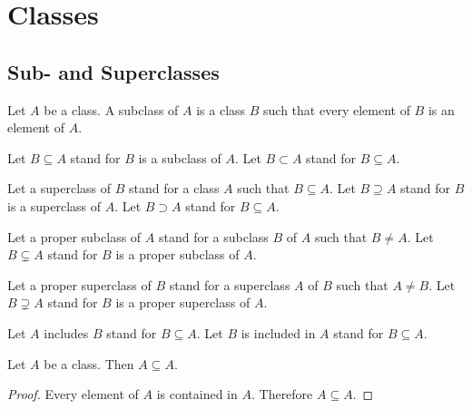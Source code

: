 \documentclass[10pt]{article}
\begin{document}
  \begin{imports}
    \begin{forthel}
    \end{forthel}
  \end{imports}


  \section*{Classes}

  \subsection*{Sub- and Superclasses}

  \begin{forthel}
    \begin{definition}
      Let $A$ be a class.
      A subclass of $A$ is a class $B$ such that every element of $B$ is an
      element of $A$.
    \end{definition}

    Let $B \subseteq A$ stand for $B$ is a subclass of $A$.
    Let $B \subset A$ stand for $B \subseteq A$.

    Let a superclass of $B$ stand for a class $A$ such that $B \subseteq A$.
    Let $B \supseteq A$ stand for $B$ is a superclass of $A$.
    Let $B \supset A$ stand for $B \subseteq A$.

    Let a proper subclass of $A$ stand for a subclass $B$ of $A$ such that $B \neq A$.
    Let $B \subsetneq A$ stand for $B$ is a proper subclass of $A$.

    Let a proper superclass of $B$ stand for a superclass $A$ of $B$ such that $A \neq B$.
    Let $B \supsetneq A$ stand for $B$ is a proper superclass of $A$.

    Let $A$ includes $B$ stand for $B \subseteq A$.
    Let $B$ is included in $A$ stand for $B \subseteq A$.
  \end{forthel}

  \begin{forthel}
    \begin{proposition}
      Let $A$ be a class.
      Then $A \subseteq A$.
    \end{proposition}
    \begin{proof}
      Every element of $A$ is contained in $A$.
      Therefore $A \subseteq A$.
    \end{proof}
  \end{forthel}
\end{document}
